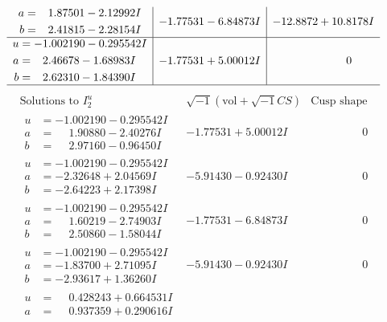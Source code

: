 \documentclass[1p]{elsarticle_modified}
\theoremstyle{definition}
\newcommand{\I}{\sqrt{-1}}
\begin{document}
$$\begin{array}{c|c|c}
\begin{aligned}
a &= \phantom{-}1.87501 - 2.12992 I \\
b &= \phantom{-}2.41815 - 2.28154 I\end{aligned}
 & -1.77531 - 6.84873 I & -12.8872 + 10.8178 I \\ \hline\begin{aligned}
u &= -1.002190 - 0.295542 I \\
a &= \phantom{-}2.46678 - 1.68983 I \\
b &= \phantom{-}2.62310 - 1.84390 I\end{aligned}
 & -1.77531 + 5.00012 I & \phantom{-0.000000 } 0\\
 \hline 
 \end{array}$$\newpage$$\begin{array}{c|c|c}  
\text{Solutions to }I^u_{2}& \I (\text{vol} + \sqrt{-1}CS) & \text{Cusp shape}\\
 \hline 
\begin{aligned}
u &= -1.002190 - 0.295542 I \\
a &= \phantom{-}1.90880 - 2.40276 I \\
b &= \phantom{-}2.97160 - 0.96450 I\end{aligned}
 & -1.77531 + 5.00012 I & \phantom{-0.000000 } 0 \\ \hline\begin{aligned}
u &= -1.002190 - 0.295542 I \\
a &= -2.32648 + 2.04569 I \\
b &= -2.64223 + 2.17398 I\end{aligned}
 & -5.91430 - 0.92430 I & \phantom{-0.000000 } 0 \\ \hline\begin{aligned}
u &= -1.002190 - 0.295542 I \\
a &= \phantom{-}1.60219 - 2.74903 I \\
b &= \phantom{-}2.50860 - 1.58044 I\end{aligned}
 & -1.77531 - 6.84873 I & \phantom{-0.000000 } 0 \\ \hline\begin{aligned}
u &= -1.002190 - 0.295542 I \\
a &= -1.83700 + 2.71095 I \\
b &= -2.93617 + 1.36260 I\end{aligned}
 & -5.91430 - 0.92430 I & \phantom{-0.000000 } 0 \\ \hline\begin{aligned}
u &= \phantom{-}0.428243 + 0.664531 I \\
a &= \phantom{-}0.937359 + 0.290616 I \\

\end{aligned}
\end{array}$$
\end{document}
